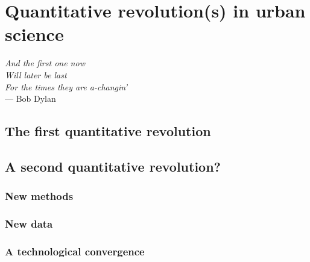 


\chapter{Quantitative revolution(s) in urban science}
\label{chap:quantitative_revolutions}

\begin{flushright}{\slshape    
And the first one now\\
Will later be last\\
For the times they are a-changin'} \\ \medskip
--- Bob Dylan 
\end{flushright}

\section{The first quantitative revolution}
\label{sec:the_first_quantitative_revolution}


\section{A second quantitative revolution?}
\label{sec:a_second_quantitative_revolution_}


    \subsection{New methods}
    \label{sub:new_methods}


    \subsection{New data}
    \label{sub:new_data}
    
    \subsection{A technological convergence}
    \label{sub:a_technological_convergence} 
